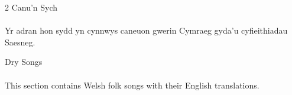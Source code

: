 \begin{multicols}{2}
	\Huge{Canu'n Sych}\\
	\vspace{1cm}\\
	\normalsize{
		\noindent
		Yr adran hon sydd yn cynnwys caneuon gwerin Cymraeg gyda'u cyfieithiadau Saesneg.
	}

	\newcolumn

	\Huge{Dry Songs}\\
	\vspace{1cm}\\
	\normalsize{
		\noindent
		This section contains Welsh folk songs with their English translations.
	}

\end{multicols}

